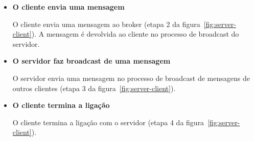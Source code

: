\begin{itemize}
\item
\textbf{O cliente envia uma mensagem}

O cliente envia uma mensagem ao broker (etapa 2 da figura~\ref{fig:server-client}). A mensagem é devolvida ao cliente no processo de broadcast do servidor.

\item
\textbf{O servidor faz broadcast de uma mensagem}

O servidor envia uma mensagem no processo de broadcast de mensagens de outros clientes (etapa 3 da figura~\ref{fig:server-client}).

\item
\textbf{O cliente termina a ligação}

O cliente termina a ligação com o servidor (etapa 4 da figura~\ref{fig:server-client}).
\end{itemize}
